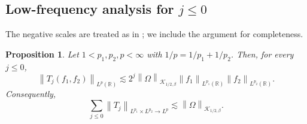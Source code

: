 \documentclass[11pt]{amsart}
\newtheorem{proposition}[definition]{Proposition}
\theoremstyle{remark}
\numberwithin{equation}{section}
\newcommand{\R}{\mathbb R}
\newcommand{\cK}{\mathcal K}
\newcommand{\norm}[1]{\left\lVert #1\right\rVert}
\begin{document}
	
	\subsection[Low-frequency analysis for \(j\le0\)]
	{Low-frequency analysis for \texorpdfstring{\(j\le0\)}{j <= 0}}
	
	
	The negative scales are treated as in \cite{DQX0404}; we include the argument
	for completeness.
	
	\begin{proposition}\label{prop:negative-scales}
		Let \(1<p_1,p_2,p<\infty\) with \(1/p=1/p_1+1/p_2\). Then, for every \(j\le0\),
		\[
		\norm{T_j(f_1,f_2)}_{L^p(\R)}
		\lesssim
		2^j\norm{\Omega}_{\cK_{1/2,\beta}}
		\norm{f_1}_{L^{p_1}(\R)}\norm{f_2}_{L^{p_2}(\R)}.
		\]
		Consequently,
		\[
		\sum_{j\le0}\norm{T_j}_{L^{p_1}\times L^{p_2}\to L^p}
		\lesssim
		\norm{\Omega}_{\cK_{1/2,\beta}}.
		\]
	\end{proposition}
	
\end{document}
